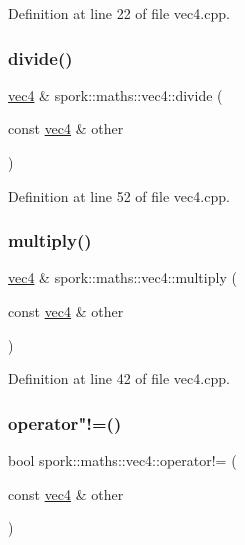 Definition at line 22 of file vec4.\+cpp.

\mbox{\label{structspork_1_1maths_1_1vec4_abdfd9b22ded3a8c55f4381826afd143b}} 
\subsubsection{\texorpdfstring{divide()}{divide()}}
{\footnotesize\ttfamily \hyperlink{structspork_1_1maths_1_1vec4}{vec4} \& spork\+::maths\+::vec4\+::divide (\begin{DoxyParamCaption}\item[{const \hyperlink{structspork_1_1maths_1_1vec4}{vec4} \&}]{other }\end{DoxyParamCaption})}



Definition at line 52 of file vec4.\+cpp.

\mbox{\label{structspork_1_1maths_1_1vec4_aa834cd0b688f659412b0f56918564092}} 
\subsubsection{\texorpdfstring{multiply()}{multiply()}}
{\footnotesize\ttfamily \hyperlink{structspork_1_1maths_1_1vec4}{vec4} \& spork\+::maths\+::vec4\+::multiply (\begin{DoxyParamCaption}\item[{const \hyperlink{structspork_1_1maths_1_1vec4}{vec4} \&}]{other }\end{DoxyParamCaption})}



Definition at line 42 of file vec4.\+cpp.

\mbox{\label{structspork_1_1maths_1_1vec4_ab6b4a7c4ad2ee1ef4afd972053a9bdfc}} 
\subsubsection{\texorpdfstring{operator"!=()}{operator!=()}}
{\footnotesize\ttfamily bool spork\+::maths\+::vec4\+::operator!= (\begin{DoxyParamCaption}\item[{const \hyperlink{structspork_1_1maths_1_1vec4}{vec4} \&}]{other }\end{DoxyParamCaption})}



